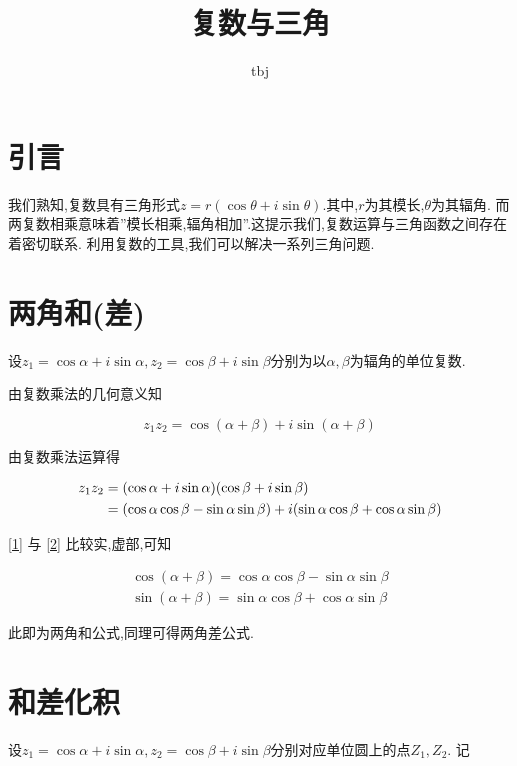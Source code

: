 \documentclass{article}
\title{复数与三角}
\author{tbj}
\date{}
\begin{document}
\maketitle

\section{引言}

我们熟知,复数具有三角形式$z = r(\cos \theta + i \sin \theta)$.其中,$r$为其模长,$\theta$为其辐角.
而两复数相乘意味着”模长相乘,辐角相加”.这提示我们,复数运算与三角函数之间存在着密切联系.
利用复数的工具,我们可以解决一系列三角问题.

\section{两角和(差)}

设$z_1 = \cos \alpha + i \sin \alpha, z_2 = \cos \beta + i \sin \beta$分别为以$\alpha, \beta$为辐角的单位复数.

由复数乘法的几何意义知

\begin{equation}
    z_1z_2 = \cos (\alpha + \beta) + i \sin (\alpha + \beta) \label{1}
\end{equation}

由复数乘法运算得

\begin{align}
z_1z_2 & = (\cos \alpha + i \sin \alpha)(\cos \beta + i \sin \beta) \notag \\
& = (\cos \alpha \cos \beta - \sin \alpha \sin \beta) + i (\sin \alpha \cos \beta + \cos \alpha \sin \beta) \label{2}
\end{align}

\eqref{1} 与 \eqref{2} 比较实,虚部,可知

\begin{align*}
    \cos (\alpha + \beta) = \cos \alpha \cos \beta - \sin \alpha \sin \beta \\
    \sin (\alpha + \beta) = \sin \alpha \cos \beta + \cos \alpha \sin \beta
\end{align*}

此即为两角和公式,同理可得两角差公式.

\section{和差化积}

设$z_1 = \cos \alpha + i \sin \alpha, z_2 = \cos \beta + i \sin \beta$分别对应单位圆上的点$Z_1, Z_2$.
记
\end{document}
